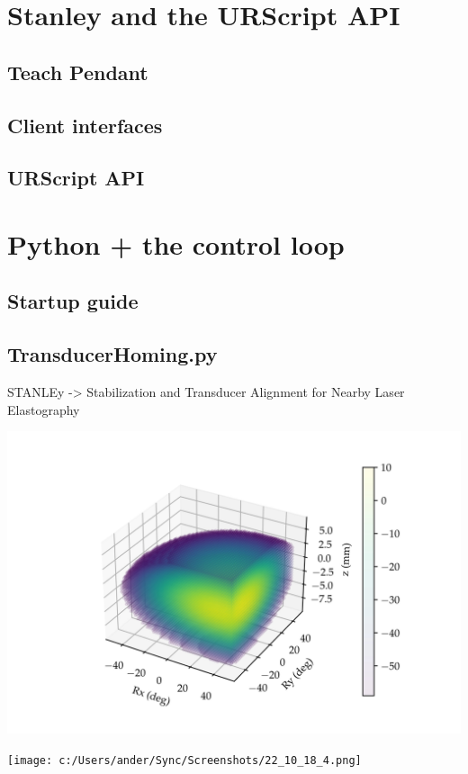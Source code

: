 \documentclass[11pt]{article}
\begin{document}
\section{Stanley and the URScript API}\label{sec:robot_summary}

\subsection{Teach Pendant}\label{sec:pendant}
\subsection{Client interfaces}\label{sec:robot_interfaces}
\subsection{URScript API}\label{sec:urscript}

\section{Python + the control loop}\label{sec:control_code}
\subsection{Startup guide}\label{sec:startup}
\subsection{TransducerHoming.py}\label{sec:TransducerHoming}

STANLEy -> Stabilization and Transducer Alignment for Nearby Laser Elastography
\begin{center}
    \includegraphics[width=.9\linewidth]{../Debugging Scripts/figures/fullscan_render_test_4.jpg}
\end{center}

\begin{center}
    \texttt{[image: c:/Users/ander/Sync/Screenshots/22\_10\_18\_4.png]}
\end{center}
\end{document}
